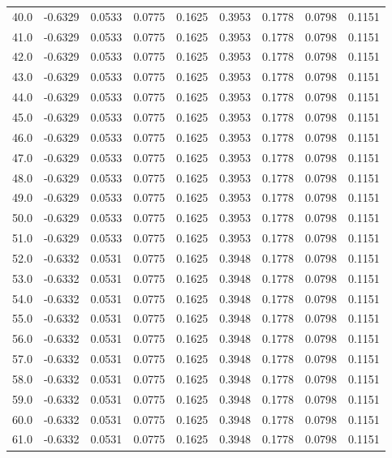 \begin{longtable}{lrrrrrrrr}
40.0 & -0.6329 & 0.0533 & 0.0775 & 0.1625 & 0.3953 & 0.1778 & 0.0798 & 0.1151 \\
41.0 & -0.6329 & 0.0533 & 0.0775 & 0.1625 & 0.3953 & 0.1778 & 0.0798 & 0.1151 \\
42.0 & -0.6329 & 0.0533 & 0.0775 & 0.1625 & 0.3953 & 0.1778 & 0.0798 & 0.1151 \\
43.0 & -0.6329 & 0.0533 & 0.0775 & 0.1625 & 0.3953 & 0.1778 & 0.0798 & 0.1151 \\
44.0 & -0.6329 & 0.0533 & 0.0775 & 0.1625 & 0.3953 & 0.1778 & 0.0798 & 0.1151 \\
45.0 & -0.6329 & 0.0533 & 0.0775 & 0.1625 & 0.3953 & 0.1778 & 0.0798 & 0.1151 \\
46.0 & -0.6329 & 0.0533 & 0.0775 & 0.1625 & 0.3953 & 0.1778 & 0.0798 & 0.1151 \\
47.0 & -0.6329 & 0.0533 & 0.0775 & 0.1625 & 0.3953 & 0.1778 & 0.0798 & 0.1151 \\
48.0 & -0.6329 & 0.0533 & 0.0775 & 0.1625 & 0.3953 & 0.1778 & 0.0798 & 0.1151 \\
49.0 & -0.6329 & 0.0533 & 0.0775 & 0.1625 & 0.3953 & 0.1778 & 0.0798 & 0.1151 \\
50.0 & -0.6329 & 0.0533 & 0.0775 & 0.1625 & 0.3953 & 0.1778 & 0.0798 & 0.1151 \\
51.0 & -0.6329 & 0.0533 & 0.0775 & 0.1625 & 0.3953 & 0.1778 & 0.0798 & 0.1151 \\
52.0 & -0.6332 & 0.0531 & 0.0775 & 0.1625 & 0.3948 & 0.1778 & 0.0798 & 0.1151 \\
53.0 & -0.6332 & 0.0531 & 0.0775 & 0.1625 & 0.3948 & 0.1778 & 0.0798 & 0.1151 \\
54.0 & -0.6332 & 0.0531 & 0.0775 & 0.1625 & 0.3948 & 0.1778 & 0.0798 & 0.1151 \\
55.0 & -0.6332 & 0.0531 & 0.0775 & 0.1625 & 0.3948 & 0.1778 & 0.0798 & 0.1151 \\
56.0 & -0.6332 & 0.0531 & 0.0775 & 0.1625 & 0.3948 & 0.1778 & 0.0798 & 0.1151 \\
57.0 & -0.6332 & 0.0531 & 0.0775 & 0.1625 & 0.3948 & 0.1778 & 0.0798 & 0.1151 \\
58.0 & -0.6332 & 0.0531 & 0.0775 & 0.1625 & 0.3948 & 0.1778 & 0.0798 & 0.1151 \\
59.0 & -0.6332 & 0.0531 & 0.0775 & 0.1625 & 0.3948 & 0.1778 & 0.0798 & 0.1151 \\
60.0 & -0.6332 & 0.0531 & 0.0775 & 0.1625 & 0.3948 & 0.1778 & 0.0798 & 0.1151 \\
61.0 & -0.6332 & 0.0531 & 0.0775 & 0.1625 & 0.3948 & 0.1778 & 0.0798 & 0.1151 \\

\end{longtable}
